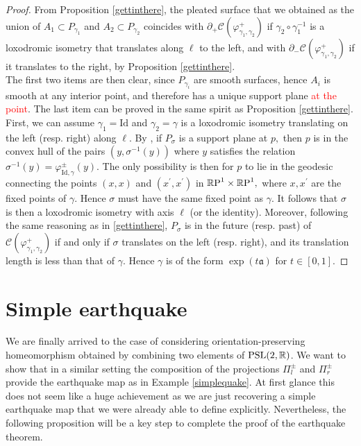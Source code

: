 \begin{proof}
    From Proposition \ref{gettinthere}, the pleated surface that we obtained as the union of $A_1\subset P_{\gamma_1}$ and $A_2\subset P_{\gamma_2}$ coincides with $\partial_+\mathcal{C}(\varphi_{\gamma_1,\gamma_2}^+)$ if $\gamma_2\circ\gamma_1^{-1}$ is a loxodromic isometry that translates along $\ell$ to the left, and with $\partial_-\mathcal{C}(\varphi_{\gamma_1,\gamma_2}^+)$ if it translates to the right, by Proposition \ref{gettinthere}. \\
    The first two items are then clear, since $P_{\gamma_i}$ are smooth surfaces, hence $A_i$ is smooth at any interior point, and therefore has a unique support plane \textcolor{red}{at the point}. The last item can be proved in the same spirit as Proposition \ref{gettinthere}. First, we can assume $\gamma_1=\text{Id}$ and $\gamma_2=\gamma$ is a loxodromic isometry translating on the left (resp. right) along $\ell.$ By , if $P_\sigma$ is a support plane at $p,$ then $p$ is in the convex hull of the pairs $(y,\sigma^{-1}(y))$ where $y$ satisfies the relation $\sigma^{-1}(y)=\varphi_{\text{Id},\gamma}^{\pm}(y).$ The only possibility is then for $p$ to lie in the geodesic connecting the points $(x,x)$ and $(x^{\prime},x^{\prime})$ in $\mathbb{R}\text{P}^1\times\mathbb{R}\text{P}^1,$ where $x,x^{\prime}$ are the fixed points of $\gamma$. Hence $\sigma$ must have the same fixed point as $\gamma$. It follows that $\sigma$ is then a loxodromic isometry with axis $\ell$ (or the identity). Moreover, following the same reasoning as in \ref{gettinthere}, $P_\sigma$ is in the future (resp. past) of $\mathcal{C}(\varphi_{\gamma_1,\gamma_2}^+)$ if and only if $\sigma$ translates on the left (resp. right), and its translation length is less than that of $\gamma.$ Hence $\gamma$ is of the form $\exp(t\mathfrak{a})$ for $t\in [0,1].$
\end{proof}

\section{Simple earthquake}
We are finally arrived to the case of considering orientation-preserving homeomorphism obtained by combining two elements of $\text{PSL}(2,\mathbb{R})$. We want to show that in a similar setting the composition of the projections $\Pi_l^{\pm}$ and $\Pi_r^\pm$ provide the earthquake map as in Example \ref{simplequake}. At first glance this does not seem like a huge achievement as we are just recovering a simple earthquake map that we were already able to define explicitly. Nevertheless, the following proposition will be a key step to complete the proof of the earthquake theorem. 


